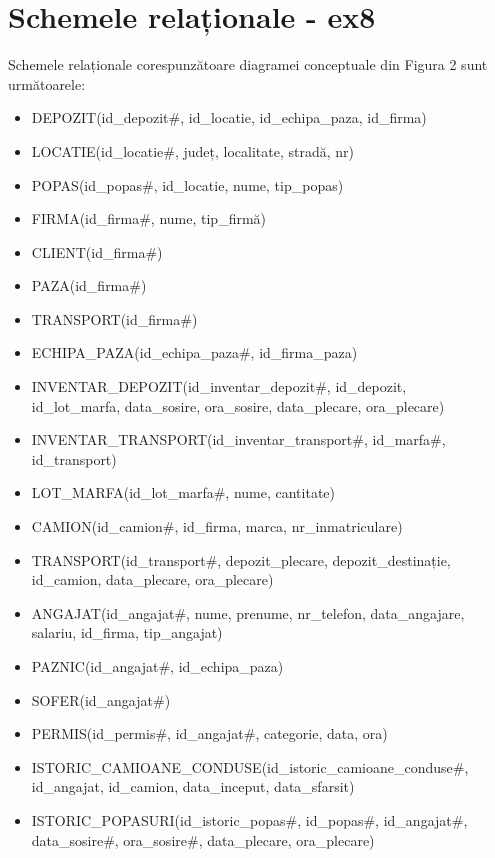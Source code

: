 \documentclass[12pt, a4paper]{article}
\begin{document}
\section{Schemele relaționale - ex8}
\quad \par
Schemele relaționale corespunzătoare diagramei conceptuale din Figura 2 sunt următoarele:
\begin{itemize}
    \item DEPOZIT(id\_depozit\#, id\_locatie, id\_echipa\_paza, id\_firma)
    \item LOCATIE(id\_locatie\#, județ, localitate, stradă, nr)
    \item POPAS(id\_popas\#, id\_locatie, nume, tip\_popas)
    \item FIRMA(id\_firma\#, nume, tip\_firmă)
    \item CLIENT(id\_firma\#)
    \item PAZA(id\_firma\#)
    \item TRANSPORT(id\_firma\#)
    \item ECHIPA\_PAZA(id\_echipa\_paza\#, id\_firma\_paza)
    \item INVENTAR\_DEPOZIT(id\_inventar\_depozit\#, id\_depozit, \\id\_lot\_marfa, data\_sosire, ora\_sosire, data\_plecare, ora\_plecare)
    \item INVENTAR\_TRANSPORT(id\_inventar\_transport\#, id\_marfa\#,\\ id\_transport)
    \item LOT\_MARFA(id\_lot\_marfa\#, nume, cantitate)
    \item CAMION(id\_camion\#, id\_firma, marca, nr\_inmatriculare)
    \item TRANSPORT(id\_transport\#, depozit\_plecare, depozit\_destinație,\\ id\_camion, data\_plecare, ora\_plecare)
    \item ANGAJAT(id\_angajat\#, nume, prenume, nr\_telefon, data\_angajare, salariu, id\_firma, tip\_angajat)
    \item PAZNIC(id\_angajat\#, id\_echipa\_paza)
    \item SOFER(id\_angajat\#)
    \item PERMIS(id\_permis\#, id\_angajat\#, categorie, data, ora)
    \item ISTORIC\_CAMIOANE\_CONDUSE(id\_istoric\_camioane\_conduse\#,\\ id\_angajat, id\_camion, data\_inceput, data\_sfarsit)
    \item ISTORIC\_POPASURI(id\_istoric\_popas\#, id\_popas\#, id\_angajat\#,\\ data\_sosire\#, ora\_sosire\#, data\_plecare, ora\_plecare)
\end{itemize}
\end{document}

